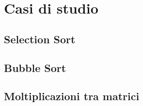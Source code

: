 \section{Casi di studio}

\subsection{Selection Sort}

\subsection{Bubble Sort}

\subsection{Moltiplicazioni tra matrici}